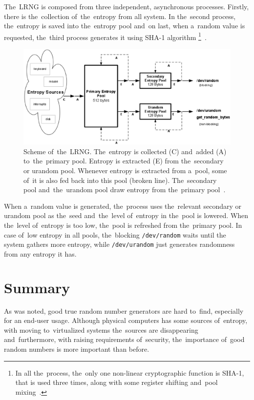 \par{
The~LRNG is composed from three independent, asynchronous processes. 
Firstly, there is the~collection of~the~entropy from all system. In the~second 
process, the~entropy is saved into the~entropy pool and~on last, when a~random 
value is requested, the~third process generates it using SHA-1 algorithm
\footnote{In all the~process, the~only one non-linear cryptographic function 
is SHA-1, that is used three times, along with some register shifting and~pool 
mixing~\cite[section~2.6]{AnalysisOfLinuxRNG}.}~\cite[chapter~2]{AnalysisOfLinuxRNG}.
}

\begin{figure}[h!]
  \centering
 \includegraphics[width=16cm,keepaspectratio]{fig/LRNG} %
\caption{Scheme of~the~LRNG. The~entropy is collected (C) and~added (A) 
to~the~primary pool. Entropy is extracted (E) from the~secondary or urandom 
pool. Whenever entropy is extracted from a~pool, some of~it is also fed back 
into this pool (broken line). The~secondary pool and~the~urandom pool draw 
entropy from the~primary pool~\cite{AnalysisOfLinuxRNG}.}
\label{fig:LRNG}
\end{figure}

\par{
When a~random value is generated, the~process uses the~relevant secondary 
or urandom pool as the~seed and~the~level of~entropy in the~pool is lowered. 
When the~level of~entropy is too low, the~pool is refreshed from the~primary pool. 
In case of~low entropy in all pools, the~blocking {\tt /dev/random} waits until the~
system gathers more entropy, while {\tt /dev/urandom} just generates 
randomness from any entropy it has.
}


\section{Summary}
\par{
As was noted, good true random number generators are hard to~find, especially 
for an end-user usage. Although physical computers has some sources 
of~entropy, with moving to~virtualized systems the~sources are 
disappearing~\cite{AnalysisOfEntropyLevels} and~furthermore, with raising 
requirements of~security, the~importance of~good random numbers is more 
important than before.
}

